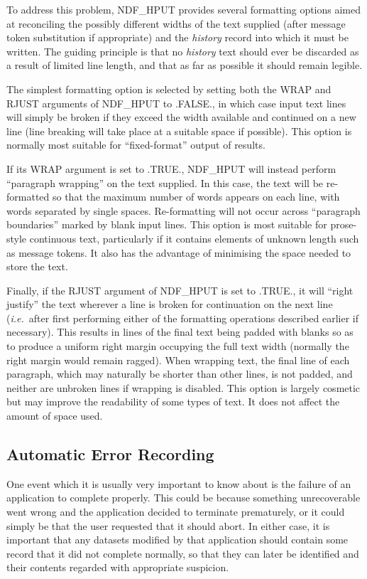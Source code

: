 \documentclass[twoside,11pt]{article}
\newcommand{\htmlref}[2]{#1}
\newcommand{\xlabel}[1]{}
\newcommand{\st}[1]{{\em{#1}}}
\begin{document}
To address this problem, \htmlref{NDF\_HPUT}{NDF_HPUT} provides several formatting options
aimed at reconciling the possibly different widths of the text
supplied (after message token substitution if appropriate) and the
\st{history\/} record into which it must be written. The guiding principle is
that no \st{history\/} text should ever be discarded as a result of limited
line length, and that as far as possible it should remain legible.

The simplest formatting option is selected by setting both the WRAP
and RJUST arguments of NDF\_HPUT to .FALSE., in which case input text
lines will simply be broken if they exceed the width available and
continued on a new line (line breaking will take place at a suitable
space if possible). This option is normally most suitable for
``fixed-format'' output of results.

If its WRAP argument is set to .TRUE., NDF\_HPUT will instead perform
``paragraph wrapping'' on the text supplied. In this case, the text
will be re-formatted so that the maximum number of words appears on
each line, with words separated by single spaces. Re-formatting will
not occur across ``paragraph boundaries'' marked by blank input lines.
This option is most suitable for prose-style continuous text,
particularly if it contains elements of unknown length such as message
tokens. It also has the advantage of minimising the space needed to
store the text.

Finally, if the RJUST argument of NDF\_HPUT is set to .TRUE., it will
``right justify'' the text wherever a line is broken for continuation
on the next line (\st{i.e.}\ after first performing either of the
formatting operations described earlier if necessary). This results in
lines of the final text being padded with blanks so as to produce a
uniform right margin occupying the full text width (normally the right
margin would remain ragged). When wrapping text, the final line of
each paragraph, which may naturally be shorter than other lines, is
not padded, and neither are unbroken lines if wrapping is disabled.
This option is largely cosmetic but may improve the readability of
some types of text. It does not affect the amount of space used.

\subsection{\xlabel{automatic_error_recording}\label{ss:historyerror}Automatic Error Recording}

One event which it is usually very important to know about is the
failure of an application to complete properly. This could be because
something unrecoverable went wrong and the application decided to
terminate prematurely, or it could simply be that the user requested
that it should abort.  In either case, it is important that any
datasets modified by that application should contain some record that
it did not complete normally, so that they can later be identified and
their contents regarded with appropriate suspicion.
\end{document}
